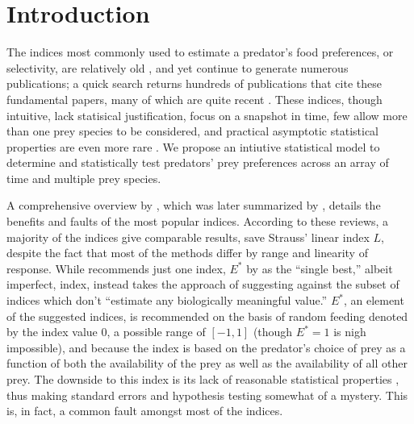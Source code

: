 \section{Introduction}
\label{sec:intro}

The indices most commonly used to estimate a predator's food preferences, or selectivity, are relatively old \citep{Ivlev:1964,Jacobs:1974,Chesson:1978,Strauss:1979,Vanderploeg:1979,Chesson:1983}, and yet continue to generate numerous publications; a quick search returns hundreds of publications that cite these fundamental papers, many of which are quite recent \citep{Clements:2014,Hansen:2014,Hellstrom:2014,Lyngdoh:2014,Madduppa:2014}.  These indices, though intuitive, lack statisical justification, focus on a snapshot in time, few allow more than one prey species to be considered, and practical asymptotic statistical properties are even more rare \citep{Lechowicz:1982}.  We propose an intiutive statistical model to determine and statistically test predators' prey preferences across an array of time and multiple prey species.   

A comprehensive overview by \citet{Lechowicz:1982}, which was later summarized by \citet{Manly:1992}, details the benefits and faults of the most popular indices.  According to these reviews, a majority of the indices give comparable results, save Strauss' linear index $L$, despite the fact that most of the methods differ by range and linearity of response.  While \citet{Lechowicz:1982} recommends just one index, $E^*$ by \citet{Vanderploeg:1979} as the ``single best,'' albeit imperfect, index, \citet{Manly:1992} instead takes the approach of suggesting against the subset of indices which don't ``estimate any biologically meaningful value.''  $E^*$, an element of the \citet{Manly:1992} suggested indices, is recommended on the basis of random feeding denoted by the index value $0$, a possible range of $[-1,1]$ (though $E^*=1$ is nigh impossible), and because the index is based on the predator's choice of prey as a function of both the availability of the prey as well as the availability of all other prey.  The downside to this index is its lack of reasonable statistical properties \citep{Lechowicz:1982}, thus making standard errors and hypothesis testing somewhat of a mystery.  This is, in fact, a common fault amongst most of the indices.  

